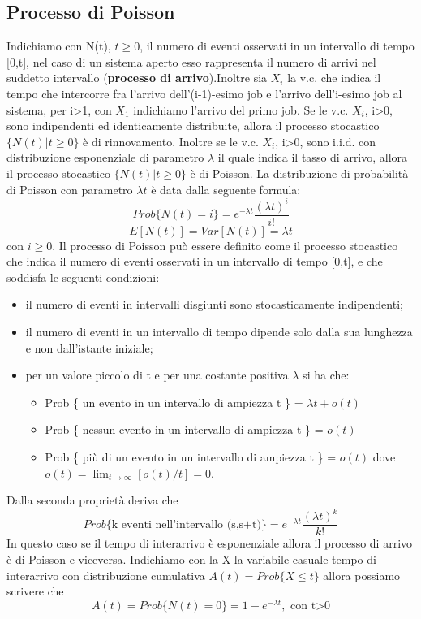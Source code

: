 \subsection{Processo di Poisson}
Indichiamo con N(t), $t\geq0$, il numero di eventi osservati in un intervallo di tempo [0,t], nel caso di un sistema aperto esso rappresenta il numero di arrivi nel suddetto intervallo (\textbf{processo di arrivo}).Inoltre sia $X_i$ la v.c. che indica il tempo che intercorre fra l’arrivo dell’(i-1)-esimo job e l’arrivo dell’i-esimo job al sistema, per i>1, con $X_1$ indichiamo l'arrivo del primo job. Se le v.c. $X_i$, i>0, sono indipendenti ed identicamente distribuite, allora il processo stocastico $\{N(t) | t\geq0\}$ è di rinnovamento. Inoltre se le v.c. $X_i$, i>0, sono i.i.d. con distribuzione esponenziale di parametro $\lambda$ il quale indica il tasso di arrivo, allora il processo stocastico $\{N(t) | t\geq0\}$ è di Poisson. La distribuzione di probabilità di Poisson con parametro $\lambda t$ è data dalla seguente formula:
\[Prob\{N(t) = i\} = e^{-\lambda t} \dfrac{(\lambda t)^i}{i!}\]
\[E[N(t)] = Var[N(t)] = \lambda t\] \label{eq:prob_poisson}
con $i\geq 0$.
Il processo di Poisson può essere definito come il processo stocastico che indica il numero di eventi osservati in un intervallo di tempo [0,t], e che soddisfa le seguenti condizioni:
\begin{itemize}
    \item il numero di eventi in intervalli disgiunti sono stocasticamente indipendenti;
    \item il numero di eventi in un intervallo di tempo dipende solo dalla sua lunghezza e non dall'istante iniziale;
    \item per un valore piccolo di t e per una costante positiva $\lambda$ si ha che:
        \begin{itemize}
             \item Prob \{ un evento in un intervallo di ampiezza t \} = $\lambda t + o(t)$
             \item Prob \{ nessun evento in un intervallo di ampiezza t \} = $o(t)$
             \item Prob \{ più di un evento in un intervallo di ampiezza t \} = $o(t)$ dove $o(t) = \lim_{t \to \infty} [o(t)/t] = 0$.
        \end{itemize}
\end{itemize}
Dalla seconda proprietà deriva che
\[Prob\{ \textrm{k eventi nell'intervallo (s,s+t)}\}= e^{-\lambda t} \dfrac{(\lambda t)^k}{k!}\]
In questo caso se il tempo di interarrivo è esponenziale allora il processo di arrivo è di Poisson e viceversa. Indichiamo con la X la variabile casuale tempo di interarrivo con distribuzione cumulativa $A(t) = Prob\{X \leq t\}$ allora possiamo scrivere che 
\[A(t) = Prob\{N(t) = 0\} = 1 - e^{-\lambda t}, \textrm{ con t>0}\]


